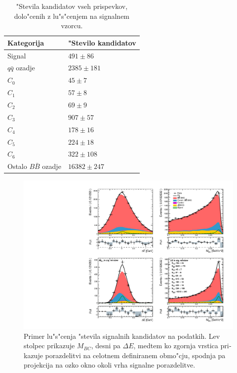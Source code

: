 \begin{otherlanguage}{slovene}
\begin{table}[H]
	\centering
	\begin{tabular}{l|l}
		Kategorija & "Stevilo kandidatov \\
		\toprule
		Signal & $491 \pm 86$ \\
		$q \bar q$ ozadje & $ 2385 \pm 181 $ \\
		$C_0$ & $ 45 \pm 7 $ \\
		$C_1$ & $ 57 \pm 8 $\\
		$C_2$ & $ 69 \pm 9 $ \\
		$C_3$ & $ 907 \pm 57 $ \\
		$C_4$ & $ 178 \pm 16 $ \\
		$C_5$ & $ 224 \pm 18 $ \\
		$C_6$ & $ 322 \pm 108 $ \\
		Ostalo $B \bar B$ ozadje & $ 16382 \pm 247 $ \\
		\bottomrule
	\end{tabular}
	\captionsetup{width=.8\linewidth}
	\caption{"Stevila kandidatov vseh prispevkov, dolo"cenih z lu"s"cenjem na signalnem vzorcu.}
	\label{tab:sig_yields_si}
\end{table}

\begin{figure}[H]
	\centering
	\captionsetup{width=0.8\linewidth}
	\includegraphics[width=\linewidth]{fig/sig_fit_data}
	\caption{Primer lu"s"cenja "stevila signalnih kandidatov na podatkih. Lev stolpec prikazuje $M_{BC}$, desni pa $\Delta E$, medtem ko zgornja vrstica prikazuje porazdelitvi na celotnem definiranem obmo"cju, spodnja pa projekcija na ozko okno okoli vrha signalne porazdelitve.}
	\label{fig:sig_datafit_si}
\end{figure}


\end{otherlanguage}
